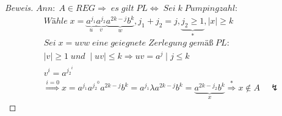 \begin{proof}[Beweis]
	\begin{math}
		Ann:\;A\in REG\Rightarrow\;es\;gilt\;PL\Leftrightarrow\;Sei\;k\;Pumpingzahl:
	\end{math}
	\begin{align*}
		&Wähle\;x=\underbrace{a^{j_1}}_u\underbrace{a^{j_2}}_v\underbrace{a^{2k-j}b^k}_w,j_1+j_2=j,\underbrace{j_2\ge1}_*,\mid x\mid\ge k\\
		&Sei\;x=uvw\;eine\;geiegnete\;Zerlegung\;gemäß\;PL:\\
		&\mid v\mid\ge1\;und\;\mid uv\mid\le k \Rightarrow uv=a^j\mid j\le k\\
		&v^i=a^{{j_2}^i}\\
		&\overset{i=0}{\Longrightarrow} x=a^{j_1}a^{{j_2}^0}a^{2k-j}b^k=a^{j_1}\lambda a^{2k-j}b^k=\underbrace{a^{2k-j_2}b^k}_x\overset{*}{\Rightarrow}x\notin A\quad\lightning
	\end{align*}
\end{proof}